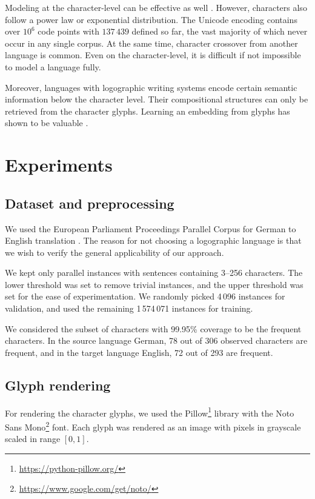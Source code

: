 \documentclass[11pt,twocolumn]{article}
\begin{document}
Modeling at the character-level can be effective as well \parencite{kalchbrenner2016neural}.
However, characters also follow a power law or exponential distribution.
The Unicode encoding contains over \(10^{6}\) code points with \(137\,439\) defined so far,
the vast majority of which never occur in any single corpus.
At the same time, character crossover from another language is common.
Even on the character-level,
it is difficult if not impossible to model a language fully.

Moreover, languages with logographic writing systems encode certain semantic information below the character level.
Their compositional structures can only be retrieved from the character glyphs.
Learning an embedding from glyphs has shown to be valuable \parencite{su2017learning}.

\section{Experiments}\label{sec:experiments}

\subsection{Dataset and preprocessing}\label{sec:datas-prepr}

We used the European Parliament Proceedings Parallel Corpus
for German to English translation \parencite{koehn2005europarl}.
The reason for not choosing a logographic language is that we wish to verify
the general applicability of our approach.

We kept only parallel instances with sentences containing 3--256 characters.
The lower threshold was set to remove trivial instances,
and the upper threshold was set for the ease of experimentation.
We randomly picked 4\,096 instances for validation,
and used the remaining 1\,574\,071 instances for training.

We considered the subset of characters with 99.95\% coverage to be the frequent characters.
In the source language German, 78 out of 306 observed characters are frequent,
and in the target language English, 72 out of 293 are frequent.

\subsection{Glyph rendering}\label{sec:glyph-rendering}

For rendering the character glyphs,
we used the Pillow\footnote{\scriptsize{\url{https://python-pillow.org/}}} library
with the Noto Sans Mono\footnote{\scriptsize{\url{https://www.google.com/get/noto/}}} font.
Each glyph was rendered as an image with pixels in grayscale scaled in range \([0,1]\).
\end{document}

